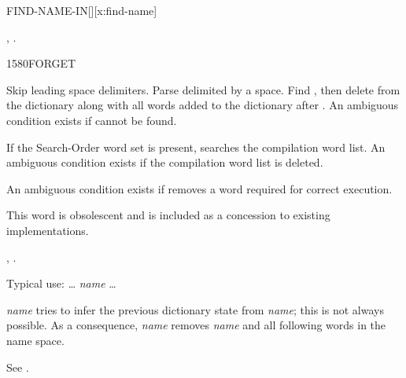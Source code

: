 \begin{worddef*}{}{FIND-NAME-IN}[][x:find-name]
\item {}


\see {},
	.

\begin{implement}
	\uline{}
\end{implement}

\begin{testing}
	\uline{}
\end{testing}
\end{worddef*}

\begin{worddef}{1580}{FORGET}
\item {}

	Skip leading space delimiters. Parse  delimited by a
	space. Find , then delete  from the
	dictionary along with all words added to the dictionary after
	. An ambiguous condition exists if  cannot
	be found.

	If the Search-Order word set is present,  searches
	the compilation word list. An ambiguous condition exists if the
	compilation word list is deleted.

	An ambiguous condition exists if  removes a word
	required for correct execution.

\note This word is obsolescent and is included as a concession to
	existing implementations.

\see {},
	.

	\begin{rationale} %
		Typical use:
			{\ldots}  \emph{name} {\ldots}

		 \emph{name} tries to infer the previous dictionary
		state from \emph{name}; this is not always possible.  As a
		consequence,  \emph{name} removes \emph{name} and
		all following words in the name space.

		See .
	\end{rationale}
\end{worddef}

